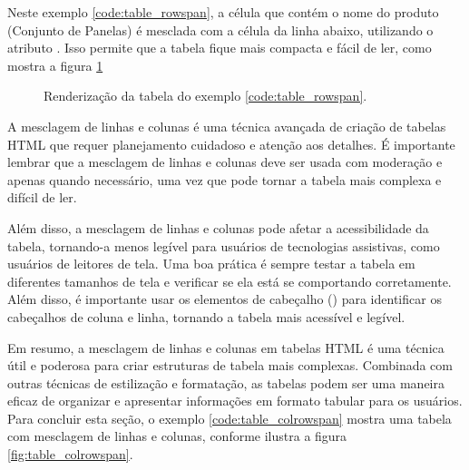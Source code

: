 Neste exemplo \ref{code:table_rowspan}, a célula que contém o nome do produto (Conjunto de Panelas) é mesclada com a célula da linha abaixo, utilizando o atributo . Isso permite que a tabela fique mais compacta e fácil de ler, como mostra a figura \ref{fig:table_rowspan}

\begin{figure}[ht!]    
    \caption{Renderização da tabela do exemplo \ref{code:table_rowspan}.}
    \label{fig:table_rowspan}
\end{figure}

A mesclagem de linhas e colunas é uma técnica avançada de criação de tabelas HTML que requer planejamento cuidadoso e atenção aos detalhes. É importante lembrar que a mesclagem de linhas e colunas deve ser usada com moderação e apenas quando necessário, uma vez que pode tornar a tabela mais complexa e difícil de ler. 

Além disso, a mesclagem de linhas e colunas pode afetar a acessibilidade da tabela, tornando-a menos legível para usuários de tecnologias assistivas, como usuários de leitores de tela. Uma boa prática é sempre testar a tabela em diferentes tamanhos de tela e verificar se ela está se comportando corretamente. Além disso, é importante usar os elementos de cabeçalho () para identificar os cabeçalhos de coluna e linha, tornando a tabela mais acessível e legível.

Em resumo, a mesclagem de linhas e colunas em tabelas HTML é uma técnica útil e poderosa para criar estruturas de tabela mais complexas. Combinada com outras técnicas de estilização e formatação, as tabelas podem ser uma maneira eficaz de organizar e apresentar informações em formato tabular para os usuários. Para concluir esta seção, o exemplo \ref{code:table_colrowspan} mostra uma tabela com mesclagem de linhas e colunas, conforme ilustra a figura \ref{fig:table_colrowspan}.


